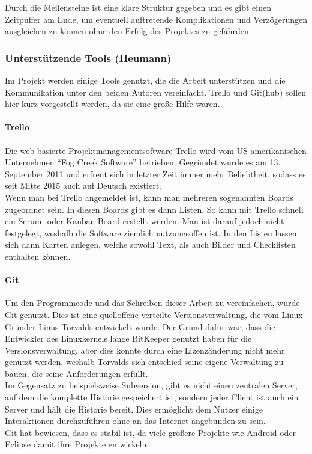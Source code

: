  Durch die Meilensteine ist eine klare Struktur gegeben und es gibt einen Zeitpuffer am Ende,
 um eventuell auftretende Komplikationen und Verzögerungen ausgleichen zu können ohne den
 Erfolg des Projektes zu gefährden.

 \subsubsection{Unterstützende Tools (Heumann)}
  Im Projekt werden einige Tools genutzt, die die Arbeit unterstützen und die Kommunikation
  unter den beiden Autoren vereinfacht. Trello und Git(hub) sollen hier kurz vorgestellt werden,
  da sie eine große Hilfe waren.

  \paragraph{Trello}
  Die web-basierte Projekt\-management\-software Trello wird vom US-amerikanischen Unternehmen
  ``Fog Creek Software'' betrieben. Gegründet wurde es am 13. September 2011 und erfreut sich  in
  letzter Zeit immer mehr Beliebtheit, sodass es seit Mitte 2015 auch auf Deutsch existiert. \\
  Wenn man bei Trello angemeldet ist, kann man mehreren sogenannten Boards zugeordnet sein. In
  diesen Boards gibt es dann Listen. So kann mit Trello schnell ein Scrum- oder Kanban-Board
  erstellt werden. Man ist darauf jedoch nicht festgelegt, weshalb die Software ziemlich
  nutzungsoffen ist. In den Listen lassen sich dann Karten anlegen, welche sowohl Text, als auch
  Bilder und Checklisten enthalten können.

  \paragraph{Git}
  Um den Programmcode und das Schreiben dieser Arbeit zu vereinfachen, wurde Git genutzt. Dies ist
  eine quelloffene verteilte Versionsverwaltung, die vom Linux Gründer Linus Torvalds entwickelt
  wurde. Der Grund dafür war, dass die Entwickler des Linuxkernels lange BitKeeper genutzt haben
  für die Versionsverwaltung, aber dies konnte durch eine Lizenzänderung nicht mehr genutzt werden,
  weshalb Torvalds sich entschied seine eigene Verwaltung zu bauen, die seine Anforderungen erfüllt. \\
  Im Gegensatz zu beispielsweise Subversion, gibt es nicht einen zentralen Server, auf dem die komplette
  Historie gespeichert ist, sondern jeder Client ist auch ein Server und hält die Historie bereit. Dies
  ermöglicht dem Nutzer einige Interaktionen durchzuführen ohne an das Internet angebunden zu sein. \\
  Git hat bewiesen, dass es stabil ist, da viele größere Projekte wie Android oder Eclipse damit ihre
  Projekte entwickeln.
